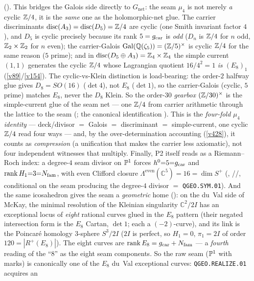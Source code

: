 \begin{keybox}
{().} This bridges the Galois side directly to $G_{\mathrm{net}}$: the seam
$\mu_4$ is not merely \emph{a} cyclic $\mathbb Z/4$, it is the \emph{same} one as the holomorphic-net glue. The
carrier discriminants $\operatorname{disc}(A_3)=\operatorname{disc}(D_5)=\mathbb Z/4$ are cyclic (one Smith
invariant factor $4$), and $D_5$ is cyclic precisely because its rank $5=g_{\mathrm{car}}$ is \emph{odd} ($D_n$ is
$\mathbb Z/4$ for $n$ odd, $\mathbb Z_2\times\mathbb Z_2$ for $n$ even); the carrier-Galois
$\operatorname{Gal}(\mathbb Q(\zeta_5))=(\mathbb Z/5)^\times$ is cyclic $\mathbb Z/4$ for the same reason ($5$ prime); and
in $\operatorname{disc}(D_5\oplus A_3)=\mathbb Z_4\times\mathbb Z_4$ the simple current $(1,1)$ generates the cyclic $\mathbb Z/4$
whose Lagrangian quotient $16/4^2=1$ \emph{is} $(E_8)_1$ (\vref{v89}/\vref{v154}). The cyclic-vs-Klein
distinction is load-bearing: the order-$2$ halfway glue gives $D_8=SO(16)$ ($\det4$), not $E_8$ ($\det1$),
so the carrier-Galois (cyclic, $5$ prime) matches $E_8$, never the $D_8$ Klein. So the order-$30$
\emph{gearbox} $(\mathbb Z/30)^\times$ is the simple-current glue of the seam net --- one $\mathbb Z/4$ from carrier
arithmetic through the lattice to the seam (\mE; the canonical identification \mC). This is the
\emph{four-fold $\mu_4$ identity} --- deck/divisor $=$ Galois $=$ discriminant $=$ simple-current, one
cyclic $\mathbb Z/4$ read four ways --- and, by the over-determination accounting (\vref{v428}), it counts as
\emph{compression} (a unification that makes the carrier less axiomatic), not four independent witnesses
that multiply.
Finally, P2 itself reads as a Riemann--Roch index: a degree-$4$
seam divisor on $\mathbb P^1$ forces $h^0{=}5{=}g_{\mathrm{car}}$ and $\operatorname{rank}H_1{=}3{=}N_{\mathrm{fam}}$, with even Clifford
closure $\Lambda^{\mathrm{even}}(\mathbb C^5)=16=\dim S^+$ (, \mE/\mC/\mO,
conditional on the seam producing the degree-$4$ divisor $=$ \texttt{QGEO.SYM.01}). And the same
icosahedron gives the seam a \emph{geometric} home (): on the du~Val side
of McKay, the minimal resolution of the Kleinian singularity $\mathbb C^2/2I$ has an exceptional locus of
\emph{eight} rational curves glued in the $E_8$ pattern (their negated intersection form is the $E_8$ Cartan,
$\det1$; each a $(-2)$-curve), and its link is the Poincar\'e homology $3$-sphere $S^3/2I$ ($2I$ is perfect,
so $H_1=0$, $\pi_1=2I$ of order $120=|R^+(E_8)|$). The eight curves are $\operatorname{rank}E_8=g_{\mathrm{car}}+N_{\mathrm{fam}}$
--- a \emph{fourth} reading of the ``$8$'' as the eight seam components. So the raw seam ($\mathbb P^1$ with marks)
is canonically one of the $E_8$ du~Val exceptional curves: \texttt{QGEO.REALIZE.01} acquires an

\end{keybox}
